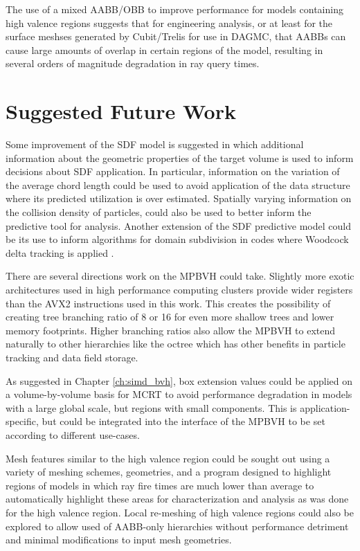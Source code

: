 The use of a mixed AABB/OBB to improve performance for models containing high
valence regions suggests that for engineering analysis, or at least for the
surface meshses generated by Cubit/Trelis for use in DAGMC, that AABBs can cause
large amounts of overlap in certain regions of the model, resulting in several
orders of magnitude degradation in ray query times.

\section{Suggested Future Work}\label{sec:future_work}

Some improvement of the SDF model is suggested in which additional information
about the geometric properties of the target volume is used to inform decisions
about SDF application. In particular, information on the variation of the
average chord length could be used to avoid application of the data structure
where its predicted utilization is over estimated. Spatially varying information
on the collision density of particles, could also be used to better inform the
predictive tool for analysis. Another extension of the SDF predictive model
could be its use to inform algorithms for domain subdivision in codes where
Woodcock delta tracking is applied \cite{Leppanen_2010} \cite{Yonghao_2011}.

There are several directions work on the MPBVH could take. Slightly more exotic
architectures used in high performance computing clusters provide wider
registers than the AVX2 instructions used in this work. This creates the
possibility of creating tree branching ratio of 8 or 16 for even more shallow
trees and lower memory footprints. Higher branching ratios also allow the MPBVH
to extend naturally to other hierarchies like the octree which has other
benefits in particle tracking and data field storage.

As suggested in Chapter \ref{ch:simd_bvh}, box extension values could be applied
on a volume-by-volume basis for MCRT to avoid performance degradation in models
with a large global scale, but regions with small components. This is
application-specific, but could be integrated into the interface of the MPBVH
to be set according to different use-cases.

Mesh features similar to the high valence region could be sought out using a
variety of meshing schemes, geometries, and a program designed to highlight
regions of models in which ray fire times are much lower than average to
automatically highlight these areas for characterization and analysis as was
done for the high valence region. Local re-meshing of high valence regions could
also be explored to allow used of AABB-only hierarchies without performance
detriment and minimal modifications to input mesh geometries.


